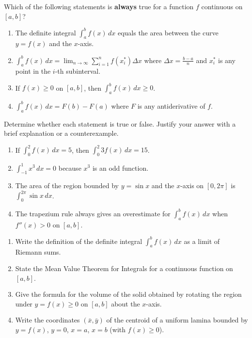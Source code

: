 \documentclass[11pt]{article}
\begin{document}
\begin{exercice}
Which of the following statements is \textbf{always} true for a function $f$ continuous on $[a,b]$?
\begin{enumerate}
\item The definite integral $\int_a^b f(x)\,dx$ equals the area between the curve $y=f(x)$ and the $x$-axis.
\item $\int_a^b f(x)\,dx = \lim_{n\to\infty} \sum_{i=1}^n f(x_i^*)\Delta x$ where $\Delta x = \frac{b-a}{n}$ and $x_i^*$ is any point in the $i$-th subinterval.
\item If $f(x) \ge 0$ on $[a,b]$, then $\int_a^b f(x)\,dx \ge 0$.
\item $\int_a^b f(x)\,dx = F(b)-F(a)$ where $F$ is any antiderivative of $f$.
\end{enumerate}
\end{exercice}

\begin{exercice}
Determine whether each statement is true or false. Justify your answer with a brief explanation or a counterexample.
\begin{enumerate}
\item If $\int_0^2 f(x)\,dx = 5$, then $\int_0^2 3f(x)\,dx = 15$.
\item $\int_{-1}^1 x^3\,dx = 0$ because $x^3$ is an odd function.
\item The area of the region bounded by $y=\sin x$ and the $x$-axis on $[0,2\pi]$ is $\int_0^{2\pi} \sin x\,dx$.
\item The trapezium rule always gives an overestimate for $\int_a^b f(x)\,dx$ when $f''(x) > 0$ on $[a,b]$.
\end{enumerate}
\end{exercice}

\begin{exercice}
\begin{enumerate}
\item Write the definition of the definite integral $\int_a^b f(x)\,dx$ as a limit of Riemann sums.
\item State the Mean Value Theorem for Integrals for a continuous function on $[a,b]$.
\item Give the formula for the volume of the solid obtained by rotating the region under $y=f(x)\ge0$ on $[a,b]$ about the $x$-axis.
\item Write the coordinates $(\bar{x},\bar{y})$ of the centroid of a uniform lamina bounded by $y=f(x)$, $y=0$, $x=a$, $x=b$ (with $f(x)\ge0$).
\end{enumerate}
\end{exercice}
\end{document}
